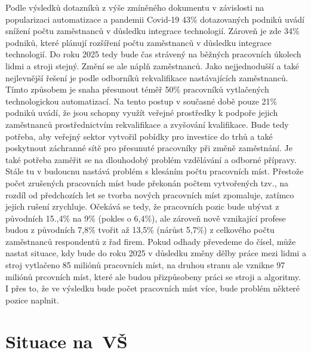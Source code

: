 \documentclass[12pt]{report}			%
\begin{document}
            Podle výsledků dotazníků z výše zmíněného dokumentu v závislosti na popularizaci automatizace a pandemii Covid-19 43\% dotazovaných podniků uvádí snížení počtu zaměstnanců v důsledku integrace technologií. Zároveň je zde 34\% podniků, které plánují rozšíření počtu zaměstnanců v důsledku integrace technologií. Do roku 2025 tedy bude čas strávený na běžných pracovních úkolech lidmi a stroji stejný. Změní se ale náplň zaměstnanců. Jako nejjednodušší a také nejlevnější řešení je podle odborníků rekvalifikace nastávajících zaměstnanců. Tímto způsobem je snaha přesunout téměř 50\% pracovníků vytlačených technologickou automatizací. Na tento postup v současné době pouze 21\% podniků uvádí, že jsou schopny využít veřejné prostředky k podpoře jejich zaměstnanců prostřednictvím rekvalifikace a zvyšování kvalifikace. Bude tedy potřeba, aby veřejný sektor vytvořil pobídky pro investice do trhů a také poskytnout záchranné sítě pro přesunuté pracovníky při změně zaměstnání. Je také potřeba zaměřit se na dlouhodobý problém vzdělávání a odborné přípravy. Stále tu v budoucnu nastává problém s klesáním počtu pracovních míst. Přestože počet zrušených pracovních míst bude překonán počtem vytvořených tzv., na rozdíl od předchozích let se tvorba nových pracovních míst zpomaluje, zatímco jejich rušení zrychluje. Očekává se tedy, že pracovních pozic bude ubývat z původních 15.,4\% na 9\% (pokles o 6,4\%), ale zároveň nově vznikající profese budou z původních 7,8\% tvořit až 13,5\% (nárůst 5,7\%) z celkového počtu zaměstnanců respondentů z řad firem. Pokud odhady převedeme do čísel, může nastat situace, kdy bude do roku 2025 v důsledku změny dělby práce mezi lidmi a stroj vytlačeno 85 miliónů pracovních míst, na druhou stranu ale vznikne 97 miliónů prcovních míst, které ale budou přizpůsobeny práci se stroji a algoritmy. I přes to, že ve výsledku bude počet pracovních míst více, bude problém některé pozice naplnit.\cite{WorldEconomicForum}
            
        \section{Situace na~VŠ}
            
\end{document}
